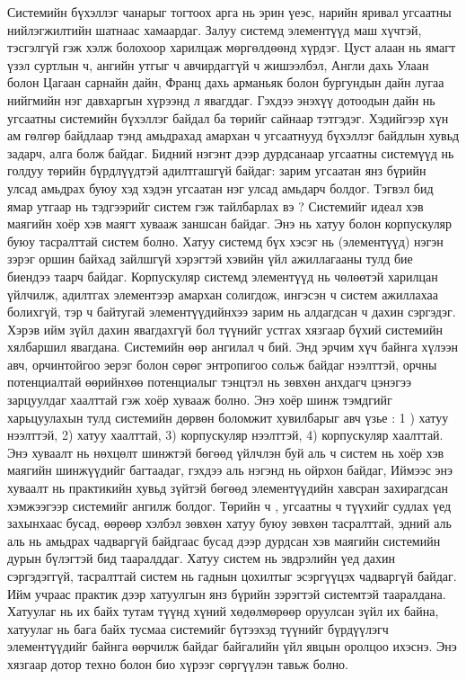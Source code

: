 Системийн бүхэллэг чанарыг тогтоох арга нь эрин үеэс, нарийн яривал угсаатны нийлэгжилтийн шатнаас хамаардаг. Залуу системд элементүүд маш хүчтэй, тэсгэлгүй гэж хэлж болохоор харилцаж мөргөлдөөнд хүрдэг. Цуст алаан нь ямагт үзэл суртлын ч, ангийн утгыг ч авчирдаггүй ч жишээлбэл, Англи дахь Улаан болон Цагаан сарнайн дайн, Франц дахь арманьяк болон бургундын дайн лугаа нийгмийн нэг давхаргын хүрээнд л явагддаг. Гэхдээ энэхүү дотоодын дайн нь угсаатны системийн бүхэллэг байдал ба төрийг сайнаар тэтгэдэг. Хэдийгээр хүн ам гөлгөр байдлаар тэнд амьдрахад амархан ч угсаатнууд бүхэллэг байдлын хувьд задарч, алга болж байдаг.
Бидний нэгэнт дээр дурдсанаар угсаатны системүүд нь голдуу төрийн бүрдлүүдтэй адилтгашгүй байдаг: зарим угсаатан янз бүрийн улсад амьдрах буюу хэд хэдэн угсаатан нэг улсад амьдарч болдог. Тэгвэл бид ямар утгаар нь тэдгээрийг систем гэж тайлбарлах вэ ?
Системийг идеал хэв маягийн хоёр хэв маягт хувааж заншсан байдаг. Энэ нь хатуу болон корпускуляр буюу тасралттай систем болно. Хатуу системд бүх хэсэг нь (элементүүд) нэгэн зэрэг оршин байхад зайлшгүй хэрэгтэй хэвийн үйл ажиллагааны тулд бие биендээ таарч байдаг. Корпускуляр системд элементүүд нь чөлөөтэй харилцан үйлчилж, адилтгах элементээр амархан солигдож, ингэсэн ч систем ажиллахаа болихгүй, тэр ч байтугай элементүүдийнхээ зарим нь алдагдсан ч дахин сэргэдэг. Хэрэв ийм зүйл дахин явагдахгүй бол түүнийг устгах хязгаар бүхий системийн хялбаршил явагдана.
Системийн өөр ангилал ч бий. Энд эрчим хүч байнга хүлээн авч, орчинтойгоо эерэг болон сөрөг энтропигоо сольж байдаг нээлттэй, орчны потенциалтай өөрийнхөө потенциалыг тэнцтэл нь зөвхөн анхдагч цэнэгээ зарцуулдаг хаалттай гэж хоёр хувааж болно. Энэ хоёр шинж тэмдгийг харьцуулахын тулд системийн дөрвөн боломжит хувилбарыг авч үзье : 1 ) хатуу нээлттэй, 2) хатуу хаалттай, 3) корпускуляр нээлттэй, 4) корпускуляр хаалттай. Энэ хуваалт нь нөхцөлт шинжтэй бөгөөд үйлчлэн буй аль ч систем нь хоёр хэв маягийн шинжүүдийг багтаадаг, гэхдээ аль нэгэнд нь ойрхон байдаг, Иймээс энэ хуваалт нь практикийн хувьд зүйтэй бөгөөд элементүүдийн хавсран захирагдсан хэмжээгээр системийг ангилж болдог.
Төрийн ч , угсаатны ч түүхийг судлах үед захынхаас бусад, өөрөөр хэлбэл зөвхөн хатуу буюу зөвхөн тасралттай, эдний аль аль нь амьдрах чадваргүй байдгаас бусад дээр дурдсан хэв маягийн системийн дурын бүлэгтэй бид тааралддаг. Хатуу систем нь эвдрэлийн үед дахин сэргэдэггүй, тасралттай систем нь гаднын цохилтыг эсэргүүцэх чадваргүй байдаг. Ийм учраас практик дээр хатуулгын янз бүрийн зэрэгтэй системтэй тааралдана. Хатуулаг нь их байх тутам түүнд хүний хөдөлмөрөөр оруулсан зүйл их байна, хатуулаг нь бага байх тусмаа системийг бүтээхэд түүнийг бүрдүүлэгч элементүүдийг байнга өөрчилж байдаг байгалийн үйл явцын оролцоо ихэснэ. Энэ хязгаар дотор техно болон био хүрээг сөргүүлэн тавьж болно.
